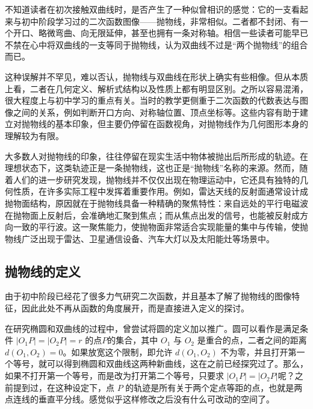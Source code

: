 
\begin{issues}
\issueDraft
\end{issues}


不知道读者在初次接触双曲线时，是否产生了一种似曾相识的感觉：它的一支看起来与初中阶段学习过的二次函数图像——抛物线，非常相似。二者都不封闭、有一个开口、略微弯曲、向无限延伸，甚至也拥有一条对称轴。相信一些读者可能早已不禁在心中将双曲线的一支等同于抛物线，认为双曲线不过是“两个抛物线”的组合而已。

这种误解并不罕见，难以否认，抛物线与双曲线在形状上确实有些相像。但从本质上看，二者在几何定义、解析式结构以及性质上都有明显区别。之所以容易混淆，很大程度上与初中学习的重点有关。当时的教学更侧重于二次函数的代数表达与图像之间的关系，例如判断开口方向、对称轴位置、顶点坐标等。这些内容有助于建立对抛物线的基本印象，但主要仍停留在函数视角，对抛物线作为几何图形本身的理解较为有限。

大多数人对抛物线的印象，往往停留在现实生活中物体被抛出后所形成的轨迹。在理想状态下，这类轨迹正是一条抛物线，这也正是“抛物线”名称的来源。然而，随着人们的进一步研究发现，抛物线并不仅仅出现在物理运动中，它还具有独特的几何性质，在许多实际工程中发挥着重要作用。例如，雷达天线的反射面通常设计成抛物面结构，原因就在于抛物线具备一种精确的聚焦特性：来自远处的平行电磁波在抛物面上反射后，会准确地汇聚到焦点；而从焦点出发的信号，也能被反射成方向一致的平行波。这一聚焦能力，使抛物面非常适合实现能量的集中与传输，使抛物线广泛出现于雷达、卫星通信设备、汽车大灯以及太阳能灶等场景中。

\subsection{抛物线的定义}

由于初中阶段已经花了很多力气研究二次函数，并且基本了解了抛物线的图像特征，因此此处不再从函数的角度展开，而是直接进入定义的探讨。

在研究椭圆和双曲线的过程中，曾尝试将圆的定义加以推广。圆可以看作是满足条件 $|O_1P| = |O_2P| = r$ 的点$P$的集合，其中 $O_1$ 与 $O_2$ 是重合的点，二者之间的距离 $d(O_1,O_2)=0$。如果放宽这个限制，即允许 $d(O_1,O_2)$ 不为零，并且打开第一个等号，就可以得到椭圆和双曲线这两种新曲线，这在之前已经探究过了。那么，如果不打开第一个等号，而是改为打开第二个等号，只要求 $|O_1P| = |O_2P|$呢？之前提到过，在这种设定下，点 $P$ 的轨迹是所有关于两个定点等距的点，也就是两点连线的垂直平分线。感觉似乎这样修改之后没有什么可改动的空间了。

